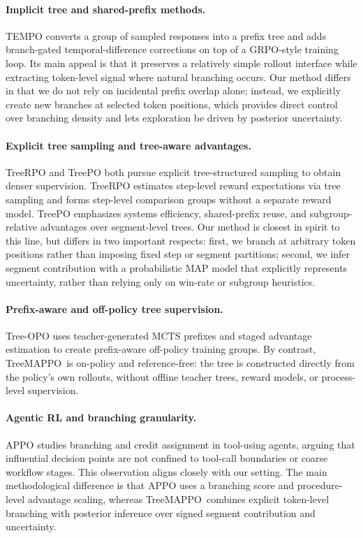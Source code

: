 \documentclass[letterpaper]{article} %
\newcommand{\ours}{TreeMAPPO}
\begin{document}
\paragraph{Implicit tree and shared-prefix methods.}
TEMPO \cite{tempo2025} converts a group of sampled responses into a prefix tree and adds branch-gated temporal-difference corrections on top of a GRPO-style training loop. Its main appeal is that it preserves a relatively simple rollout interface while extracting token-level signal where natural branching occurs. Our method differs in that we do not rely on incidental prefix overlap alone; instead, we explicitly create new branches at selected token positions, which provides direct control over branching density and lets exploration be driven by posterior uncertainty.

\paragraph{Explicit tree sampling and tree-aware advantages.}
TreeRPO \cite{treerpo2025} and TreePO \cite{treepo2025} both pursue explicit tree-structured sampling to obtain denser supervision. TreeRPO estimates step-level reward expectations via tree sampling and forms step-level comparison groups without a separate reward model. TreePO emphasizes systems efficiency, shared-prefix reuse, and subgroup-relative advantages over segment-level trees. Our method is closest in spirit to this line, but differs in two important respects: first, we branch at arbitrary token positions rather than imposing fixed step or segment partitions; second, we infer segment contribution with a probabilistic MAP model that explicitly represents uncertainty, rather than relying only on win-rate or subgroup heuristics.

\paragraph{Prefix-aware and off-policy tree supervision.}
Tree-OPO \cite{treeopo2025} uses teacher-generated MCTS prefixes and staged advantage estimation to create prefix-aware off-policy training groups. By contrast, \ours\ is on-policy and reference-free: the tree is constructed directly from the policy's own rollouts, without offline teacher trees, reward models, or process-level supervision.

\paragraph{Agentic RL and branching granularity.}
APPO \cite{appo2026} studies branching and credit assignment in tool-using agents, arguing that influential decision points are not confined to tool-call boundaries or coarse workflow stages. This observation aligns closely with our setting. The main methodological difference is that APPO uses a branching score and procedure-level advantage scaling, whereas \ours\ combines explicit token-level branching with posterior inference over signed segment contribution and uncertainty.
\end{document}
